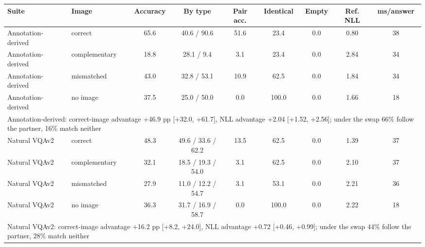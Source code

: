 \begin{tabular}{llccccccc}\toprule Suite & Image & Accuracy & By type & Pair acc. & Identical & Empty & Ref. NLL & ms/answer \\ \midrule
Annotation-derived & correct & 65.6 & 40.6 / 90.6 & 51.6 & 23.4 & 0.0 & 0.80 & 38 \\
Annotation-derived & complementary & 18.8 & 28.1 / 9.4 & 3.1 & 23.4 & 0.0 & 2.84 & 34 \\
Annotation-derived & mismatched & 43.0 & 32.8 / 53.1 & 10.9 & 62.5 & 0.0 & 1.84 & 34 \\
Annotation-derived & no image & 37.5 & 25.0 / 50.0 & 0.0 & 100.0 & 0.0 & 1.66 & 18 \\
\multicolumn{9}{l}{\footnotesize Annotation-derived: correct-image advantage +46.9 pp [+32.0, +61.7], NLL advantage +2.04 [+1.52, +2.56]; under the swap 66\% follow the partner, 16\% match neither} \\ \midrule
Natural VQAv2 & correct & 48.3 & 49.6 / 33.6 / 62.2 & 13.5 & 62.5 & 0.0 & 1.39 & 37 \\
Natural VQAv2 & complementary & 32.1 & 18.5 / 19.3 / 54.0 & 3.1 & 62.5 & 0.0 & 2.10 & 37 \\
Natural VQAv2 & mismatched & 27.9 & 11.0 / 12.2 / 54.7 & 3.1 & 53.1 & 0.0 & 2.21 & 36 \\
Natural VQAv2 & no image & 36.3 & 31.7 / 16.9 / 58.7 & 0.0 & 100.0 & 0.0 & 2.22 & 18 \\
\multicolumn{9}{l}{\footnotesize Natural VQAv2: correct-image advantage +16.2 pp [+8.2, +24.0], NLL advantage +0.72 [+0.46, +0.99]; under the swap 44\% follow the partner, 28\% match neither} \\
\bottomrule\end{tabular}
